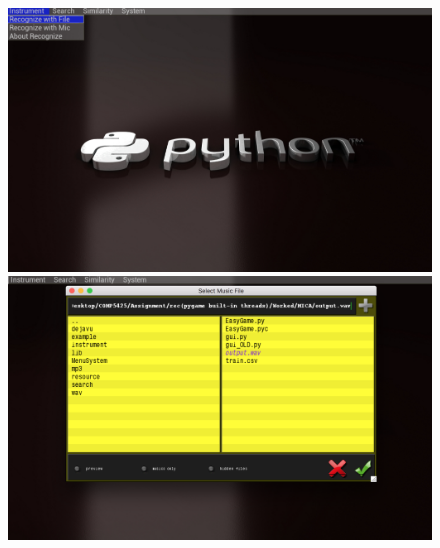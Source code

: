 \documentclass[whitelogo,12pt]{tudelft-report}
\begin{document}
\begin{figure}[!htb]
  \includegraphics[width=\linewidth]{if1}
\endminipage\hfill
{}
  \includegraphics[width=\linewidth]{if2}
\endminipage\hfill\\


\end{figure}
\end{document}
